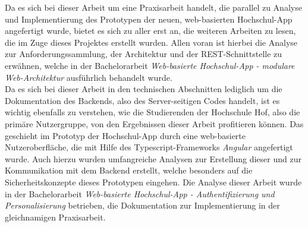 Da es sich bei dieser Arbeit um eine Praxisarbeit handelt, die parallel zu Analyse und Implementierung des Prototypen der neuen, web-basierten Hochschul-\ac{App} angefertigt wurde, bietet es sich zu aller erst an, die weiteren Arbeiten zu lesen, die im Zuge dieses Projektes erstellt wurden. Allen voran ist hierbei die Analyse zur Anforderungssammlung, der Architektur und der \ac{REST}-Schnittstelle zu erwähnen, welche in der Bachelorarbeit \textit{Web-basierte Hochschul-\ac{App} - modulare Web-Architektur} ausführlich behandelt wurde\autocite[][]{dnba}.\\
\linebreak
Da es sich bei dieser Arbeit in den technischen Abschnitten lediglich um die Dokumentation des Backends, also des Server-seitigen Codes handelt, ist es wichtig ebenfalls zu verstehen, wie die Studierenden der Hochschule Hof, also die primäre Nutzergruppe, von den Ergebnissen dieser Arbeit profitieren können. Das geschieht im Prototyp der Hochschul-\ac{App} durch eine web-basierte Nutzeroberfläche, die mit Hilfe des Typescript-Frameworks \textit{Angular} angefertigt wurde. Auch hierzu wurden umfangreiche Analysen zur Erstellung dieser und zur Kommunikation mit dem Backend erstellt, welche besonders auf die Sicherheitskonzepte dieses Prototypen eingehen. Die Analyse dieser Arbeit wurde in der Bachelorarbeit \textit{Web-basierte Hochschul-\ac{App} - Authentifizierung und Personalisierung} betrieben, die Dokumentation zur Implementierung in der gleichnamigen Praxisarbeit\autocites[][]{andreasba}[][]{andreaspa}.